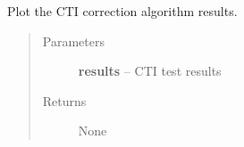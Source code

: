 \documentclass[a4paper,11pt,english]{sphinxmanual}
\begin{document}
\begin{fulllineitems}
\label{reduction:analysis.testCTIcorrection.plotResults}
Plot the CTI correction algorithm results.
\begin{quote}\begin{description}
\item[{Parameters}] \leavevmode
\textbf{results} -- CTI test results

\item[{Returns}] \leavevmode
None

\end{description}\end{quote}

\end{fulllineitems}

\end{document}
